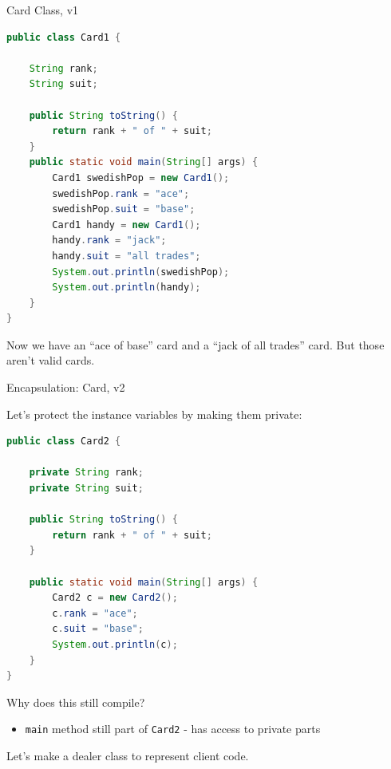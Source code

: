 \documentclass{beamer}
\begin{document}
\begin{frame}[fragile]{Card Class, v1}

\vspace{-.1in}
\begin{lstlisting}[language=Java]
public class Card1 {

    String rank;
    String suit;

    public String toString() {
        return rank + " of " + suit;
    }
    public static void main(String[] args) {
        Card1 swedishPop = new Card1();
        swedishPop.rank = "ace";
        swedishPop.suit = "base";
        Card1 handy = new Card1();
        handy.rank = "jack";
        handy.suit = "all trades";
        System.out.println(swedishPop);
        System.out.println(handy);
    }
}
\end{lstlisting}
\vspace{-.1in}
Now we have an ``ace of base'' card and a ``jack of all trades'' card.  But those aren't valid cards.


\end{frame}

\begin{frame}[fragile]{Encapsulation: Card, v2}

\vspace{-.05in}
Let's protect the instance variables by making them private:
\begin{lstlisting}[language=Java]
public class Card2 {

    private String rank;
    private String suit;

    public String toString() {
        return rank + " of " + suit;
    }

    public static void main(String[] args) {
        Card2 c = new Card2();
        c.rank = "ace";
        c.suit = "base";
        System.out.println(c);
    }
}
\end{lstlisting}
\vspace{-.05in}
Why does this still compile?

\begin{itemize}
\item {\tt main} method still part of {\tt Card2} - has access to private parts
\end{itemize}
Let's make a dealer class to represent client code.

\end{frame}
\end{document}
